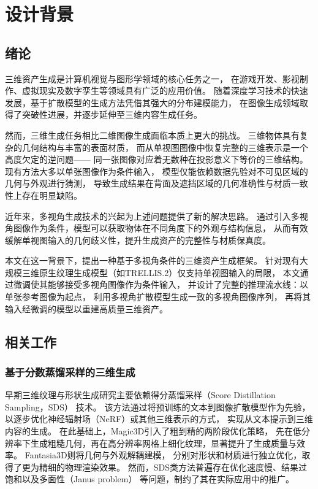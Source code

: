\cleardoublepage

\section{设计背景}

\subsection{绪论}
三维资产生成是计算机视觉与图形学领域的核心任务之一，
在游戏开发、影视制作、虚拟现实及数字孪生等领域具有广泛的应用价值。\cite{陈娜娜2025, 赵沁平2009虚拟现实综述}
随着深度学习技术的快速发展，基于扩散模型的生成方法凭借其强大的分布建模能力，
在图像生成领域取得了突破性进展，并逐步延伸至三维内容生成任务。

然而，三维生成任务相比二维图像生成面临本质上更大的挑战。
三维物体具有复杂的几何结构与丰富的表面材质，
而从单视图图像中恢复完整的三维表示是一个高度欠定的逆问题——
同一张图像对应着无数种在投影意义下等价的三维结构。
现有方法大多以单张图像作为条件输入，
模型仅能依赖数据先验对不可见区域的几何与外观进行猜测，
导致生成结果在背面及遮挡区域的几何准确性与材质一致性上存在明显缺陷。

近年来，多视角生成技术的兴起为上述问题提供了新的解决思路。
通过引入多视角图像作为条件，模型可以获取物体在不同角度下的外观与结构信息，
从而有效缓解单视图输入的几何歧义性，提升生成资产的完整性与材质保真度。

本文在这一背景下，提出一种基于多视角条件的三维资产生成框架。
针对现有大规模三维原生纹理生成模型（如TRELLIS.2\cite{xiang2025native}）仅支持单视图输入的局限，
本文通过微调使其能够接受多视角图像作为条件输入，
并设计了完整的推理流水线：以单张参考图像为起点，
利用多视角扩散模型生成一致的多视角图像序列，
再将其输入经微调的模型以重建高质量三维资产。

\subsection{相关工作}

\subsubsection{基于分数蒸馏采样的三维生成}

早期三维纹理与形状生成研究主要依赖得分蒸馏采样（Score Distillation Sampling，SDS）
技术\cite{poole2022dreamfusion}。
该方法通过将预训练的文本到图像扩散模型作为先验，
以逐步优化神经辐射场（NeRF）\cite{mildenhall2021nerf}或其他三维表示的方式，
实现从文本提示到三维内容的生成。
在此基础上，Magic3D\cite{lin2023magic3d}引入了粗到精的两阶段优化策略，
先在低分辨率下生成粗糙几何，再在高分辨率网格上细化纹理，显著提升了生成质量与效率。
Fantasia3D\cite{chen2023fantasia3d}则将几何与外观解耦建模，
分别对形状和材质进行独立优化，取得了更为精细的物理渲染效果。
然而，SDS类方法普遍存在优化速度慢、结果过饱和以及多面性（Janus problem）
等问题\cite{armandpour2023re}，制约了其在实际应用中的推广。

